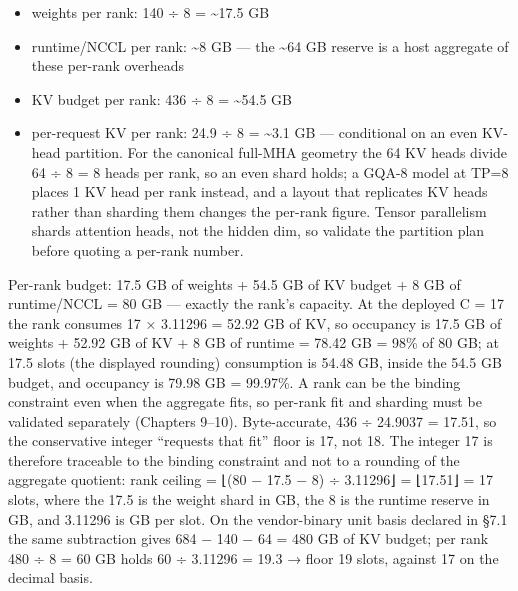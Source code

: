 \begin{itemize}
\tightlist
\item
  weights per rank: 140 ÷ 8 = \textasciitilde17.5 GB
\item
  runtime/NCCL per rank: \textasciitilde8 GB --- the \textasciitilde64
  GB reserve is a host aggregate of these per-rank overheads
\item
  KV budget per rank: 436 ÷ 8 = \textasciitilde54.5 GB
\item
  per-request KV per rank: 24.9 ÷ 8 = \textasciitilde3.1 GB ---
  conditional on an even KV-head partition. For the canonical full-MHA
  geometry the 64 KV heads divide 64 ÷ 8 = 8 heads per rank, so an even
  shard holds; a GQA-8 model at TP=8 places 1 KV head per rank instead,
  and a layout that replicates KV heads rather than sharding them
  changes the per-rank figure. Tensor parallelism shards attention
  heads, not the hidden dim, so validate the partition plan before
  quoting a per-rank number.
\end{itemize}

Per-rank budget: 17.5 GB of weights + 54.5 GB of KV budget + 8 GB of
runtime/NCCL = 80 GB --- exactly the rank's capacity. At the deployed C
= 17 the rank consumes 17 × 3.11296 = 52.92 GB of KV, so occupancy is
17.5 GB of weights + 52.92 GB of KV + 8 GB of runtime = 78.42 GB = 98\%
of 80 GB; at 17.5 slots (the displayed rounding) consumption is 54.48
GB, inside the 54.5 GB budget, and occupancy is 79.98 GB = 99.97\%. A
rank can be the binding constraint even when the aggregate fits, so
per-rank fit and sharding must be validated separately (Chapters 9--10).
Byte-accurate, 436 ÷ 24.9037 = 17.51, so the conservative integer
``requests that fit'' floor is 17, not 18. The integer 17 is therefore
traceable to the binding constraint and not to a rounding of the
aggregate quotient: rank ceiling = ⌊(80 − 17.5 − 8) ÷ 3.11296⌋ = ⌊17.51⌋
= 17 slots, where the 17.5 is the weight shard in GB, the 8 is the
runtime reserve in GB, and 3.11296 is GB per slot. On the vendor-binary
unit basis declared in §7.1 the same subtraction gives 684 − 140 − 64 =
480 GB of KV budget; per rank 480 ÷ 8 = 60 GB holds 60 ÷ 3.11296 = 19.3
→ floor 19 slots, against 17 on the decimal basis.

